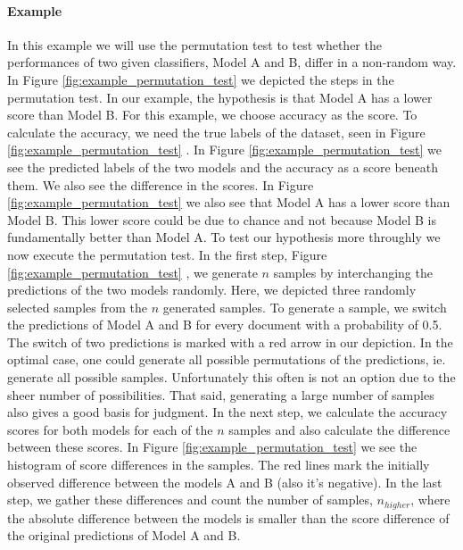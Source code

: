\paragraph{Example}
In this example we will use the permutation test to test whether the 
  performances of two given classifiers, Model A and B, differ in a non-random way.
In Figure \ref{fig:example_permutation_test} we depicted the steps in the permutation test. 
In our example, the hypothesis is that Model A has a lower score than Model B.
For this example, we choose accuracy as the score.
To calculate the accuracy, we need the true labels of the dataset, seen in Figure \ref{fig:example_permutation_test} \textbf{}.
In Figure \ref{fig:example_permutation_test} \textbf{} we see the predicted labels of the two models and the accuracy as a score beneath them. 
We also see the difference in the scores.
In Figure \ref{fig:example_permutation_test} \textbf{} we also see that Model A has a lower score than Model B.
This lower score could be due to chance and not because Model B is fundamentally better than Model A.
To test our hypothesis more throughly we now execute the permutation test.
In the first step, Figure \ref{fig:example_permutation_test} \textbf{}, we generate $n$ samples by interchanging the predictions of the two models randomly.
Here, we depicted three randomly selected samples from the $n$ generated samples.
To generate a sample, we switch the predictions of Model A and B for every document with a probability of 0.5.
The switch of two predictions is marked with a red arrow in our depiction.
In the optimal case, one could generate all possible permutations of the predictions, ie. generate all possible samples.
Unfortunately this often is not an option due to the sheer number of possibilities. That said, generating a large number of samples also gives a good basis for judgment.
In the next step, we calculate the accuracy scores for both models for each of the $n$ samples and also calculate the difference between these scores.
In Figure \ref{fig:example_permutation_test} \textbf{} we see the histogram of score differences in the samples.
The red lines mark the initially observed difference between the models A and B (also it's negative).
In the last step, we gather these differences and count the number of samples, $n_{higher}$, where the absolute difference between the models is smaller than the score difference of the original predictions of Model A and B.
